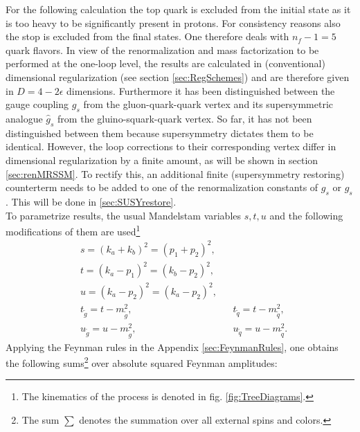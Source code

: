 For the following calculation the top quark is excluded from the initial state as it is too heavy to be significantly present in protons. %
For consistency reasons also the stop is excluded from the final states. One therefore deals with $n_f-1 = 5$ quark flavors. In view of the renormalization and mass factorization to be performed at the one-loop level, the results are calculated in (conventional) dimensional regularization (see section \ref{sec:RegSchemes}) and are therefore given in $D = 4 - 2\epsilon$ dimensions. Furthermore it has been distinguished between the gauge coupling $g_s$ from the gluon-quark-quark vertex and its supersymmetric analogue $\hat{g}_s$ from the gluino-squark-quark vertex. So far, it has not been distinguished between them because supersymmetry dictates them to be identical. However, the loop corrections to their corresponding vertex differ in dimensional regularization by a finite amount, as will be shown in section \ref{sec:renMRSSM}. To rectify this, an additional finite (supersymmetry restoring) counterterm needs to be added to one of the renormalization constants of $g_s$ or $\hat{g}_s$. This will be done in \ref{sec:SUSYrestore}.\\
To parametrize results, the usual Mandelstam variables $s,t,u$ and the following modifications of them are used\footnote{The kinematics of the process is denoted in fig. \ref{fig:TreeDiagrams}.}
\begin{align}
& s = (k_a + k_b)^2 = (p_1 + p_2)^2,\nonumber\\
& t = (k_a - p_1)^2 = (k_b - p_2)^2,\nonumber\\
& u = (k_a - p_2)^2 = (k_a - p_2)^2,\nonumber\\
& t_{\tilde{g}} = t - m_{\tilde{g}}^2, && t_{\tilde{q}} = t- m_{\tilde{q}}^2,\nonumber\\
& u_{\tilde{g}} = u - m_{\tilde{g}}^2, && u_{\tilde{q}} = u- m_{\tilde{q}}^2.
\end{align}
\newpage
Applying the Feynman rules in the Appendix \ref{sec:FeynmanRules}, one obtains the following sums\footnote{The sum $\sum$ denotes the summation over all external spins and colors.} over absolute squared Feynman amplitudes:
